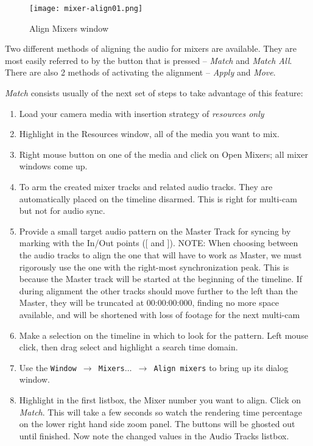 \begin{figure}[htpb]
    \centering
    \texttt{[image: mixer-align01.png]}
    \caption{Align Mixers window}
    \label{fig:mixer-align01}
\end{figure}

Two different methods of aligning the audio for mixers are available. They are most easily referred to by the button that is pressed -- \textit{Match} and \textit{Match All}. There are also 2 methods of activating the alignment -- \textit{Apply} and \textit{Move}.  

\textit{Match} consists usually of the next set of steps to take advantage of this feature:

\begin{enumerate}
    \item Load your camera media with insertion strategy of \textit{resources only}
    \item Highlight in the Resources window, all of the media you want to mix.
    \item Right mouse button on one of the media and click on Open Mixers; all mixer windows come up.
    \item To arm the created mixer tracks and related audio tracks. They are automatically placed on the timeline disarmed. This is right for multi-cam but not for audio sync.
    \item Provide a small target audio pattern on the Master Track for syncing by marking with the In/Out points ([ and ]). NOTE: When choosing between the audio tracks to align the one that will have to work as Master, we must rigorously use the one with the right-most synchronization peak. This is because the Master track will be started at the beginning of the timeline. If during alignment the other tracks should move further to the left than the Master, they will be truncated at 00:00:00:000, finding no more space available, and will be shortened with loss of footage for the next multi-cam
    \item Make a selection on the timeline in which to look for the pattern. Left mouse click, then drag select and highlight a search time domain. 
    \item Use the \texttt{Window $\rightarrow$ Mixers$\dots$ $\rightarrow$  Align mixers} to bring up its dialog window.
    \item Highlight in the first listbox, the Mixer number you want to align. Click on \textit{Match}. This will take a few seconds so watch the rendering time percentage on the lower right hand side zoom panel. The buttons will be ghosted out until finished. Now note the changed values in the Audio Tracks listbox.

\end{enumerate}
